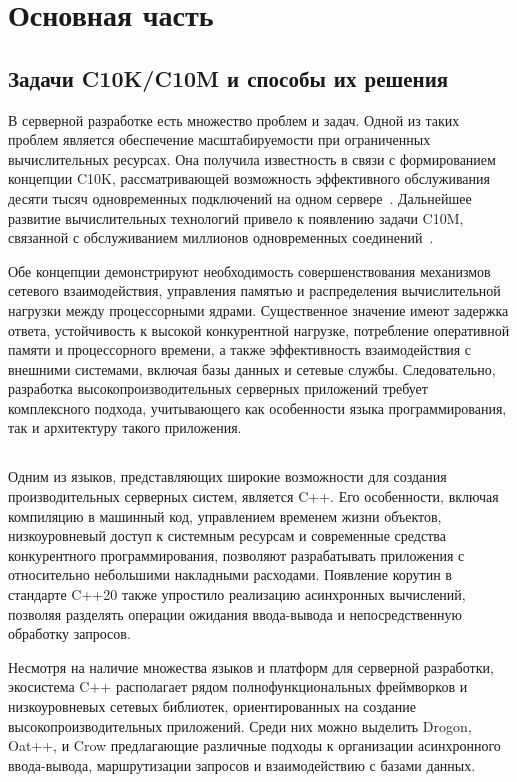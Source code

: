 \documentclass[14pt]{extarticle}
\begin{document}
\section{Основная часть}

\subsection{Задачи C10K/C10M и способы их решения}

В серверной разработке есть множество проблем и задач. Одной из таких проблем является обеспечение масштабируемости при ограниченных вычислительных ресурсах. Она получила известность в связи с формированием концепции C10K, рассматривающей возможность эффективного обслуживания десяти тысяч одновременных подключений на одном сервере~\autocite{dong:c10k-problem_2009}. Дальнейшее развитие вычислительных технологий привело к появлению задачи C10M, связанной с обслуживанием миллионов одновременных соединений~\autocite{song:c10m-problem_2023}.

Обе концепции демонстрируют необходимость совершенствования механизмов сетевого взаимодействия, управления памятью и распределения вычислительной нагрузки между процессорными ядрами. Существенное значение имеют задержка ответа, устойчивость к высокой конкурентной нагрузке, потребление оперативной памяти и процессорного времени, а также эффективность взаимодействия с внешними системами, включая базы данных и сетевые службы. Следовательно, разработка высокопроизводительных серверных приложений требует комплексного подхода, учитывающего как особенности языка программирования, так и архитектуру такого приложения.

\subsection{}

Одним из языков, представляющих широкие возможности для создания производительных серверных систем, является C++. Его особенности, включая компиляцию в машинный код, управлением временем жизни объектов, низкоуровневый доступ к системным ресурсам и современные средства конкурентного программирования, позволяют разрабатывать приложения с относительно небольшими накладными расходами. Появление корутин в стандарте C++20 также упростило реализацию асинхронных вычислений, позволяя разделять операции ожидания ввода-вывода и непосредственную обработку запросов.

Несмотря на наличие множества языков и платформ для серверной разработки, экосистема C++ располагает рядом полнофункциональных фреймворков и низкоуровневых сетевых библиотек, ориентированных на создание высокопроизводительных приложений. Среди них можно выделить Drogon, Oat++, и Crow предлагающие различные подходы к организации асинхронного ввода-вывода, маршрутизации запросов и взаимодействию с базами данных.
\end{document}
